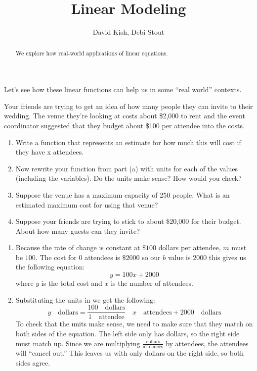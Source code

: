 \documentclass{ximera}
\author{David Kish, Debi Stout}
\title{Linear Modeling}
\begin{document}
\begin{abstract}
  We explore how real-world applications of linear equations.
\end{abstract}
\maketitle

Let's see how these linear functions can help us in some ``real world'' contexts.

\begin{example}	
Your friends are trying to get an idea of how many people they can invite to their wedding.  The venue they're looking at costs about \$2,000 to rent and the event coordinator suggested that they budget about \$100 per attendee into the costs.
\begin{enumerate}
\item Write a function that represents an estimate for how much this will cost if they have x attendees.	
\item Now rewrite your function from part (a) with units for each of the values (including the variables). Do the units make sense? How would you check?
\item	Suppose the venue has a maximum capacity of 250 people.  What is an estimated maximum cost for using that venue?
\item	Suppose your friends are trying to stick to about \$20,000 for their budget.  About how many guests can they invite?
\end{enumerate}
\begin{explanation}
\begin{enumerate}
\item Because the rate of change is constant at $\$100$ dollars per attendee, $m$ must be $100$. The cost for $0$ attendees is $\$2000$ so our $b$ value is $2000$ this gives us the following equation: 
\[
y=100x+2000
\]
where $y$ is the total cost and $x$ is the number of attendees.
\item Substituting the units in we get the following:
\[
y \quad \text{dollars} = \frac{100 \quad \text{dollars}}{1 \quad \text{attendee}} \quad x \quad  \text{attendees} + 2000 \quad \text{dollars}
\]
To check that the units make sense, we need to make sure that they match on both sides of the equation. The left side only has dollars, so the right side must match up. Since we are multiplying $\frac{\text{dollars}}{\text{attendees}}$ by attendees, the attendees will ``cancel out.'' This leaves us with only dollars on the right side, so both sides agree.

\end{enumerate}
\end{explanation}
\end{example}
\end{document}
